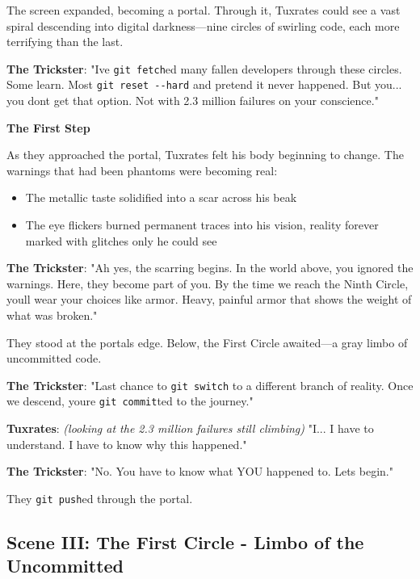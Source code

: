 The screen expanded, becoming a portal. Through it, Tuxrates could see a vast spiral descending into digital darkness---nine circles of swirling code, each more terrifying than the last.

\textbf{The Trickster}: "I\textquotesingle ve \texttt{git\ fetch}ed many fallen developers through these circles. Some learn. Most \texttt{git\ reset\ -\/-hard} and pretend it never happened. But you... you don\textquotesingle t get that option. Not with 2.3 million failures on your conscience."

\textbf{The First Step}

As they approached the portal, Tuxrates felt his body beginning to change. The warnings that had been phantoms were becoming real:

\begin{itemize}
\tightlist
\item
  The metallic taste solidified into a scar across his beak
\item
  The eye flickers burned permanent traces into his vision, reality forever marked with glitches only he could see
\end{itemize}

\textbf{The Trickster}: "Ah yes, the scarring begins. In the world above, you ignored the warnings. Here, they become part of you. By the time we reach the Ninth Circle, you\textquotesingle ll wear your choices like armor. Heavy, painful armor that shows the weight of what was broken."

They stood at the portal\textquotesingle s edge. Below, the First Circle awaited---a gray limbo of uncommitted code.

\textbf{The Trickster}: "Last chance to \texttt{git\ switch} to a different branch of reality. Once we descend, you\textquotesingle re \texttt{git\ commit}ted to the journey."

\textbf{Tuxrates}: \emph{(looking at the 2.3 million failures still climbing)} "I... I have to understand. I have to know why this happened."

\textbf{The Trickster}: "No. You have to know what YOU happened to. Let\textquotesingle s begin."

They \texttt{git\ push}ed through the portal.

\bookdivider

\subsection{Scene III: The First Circle - Limbo of the Uncommitted}\label{scene-iii-the-first-circle---limbo-of-the-uncommitted}

